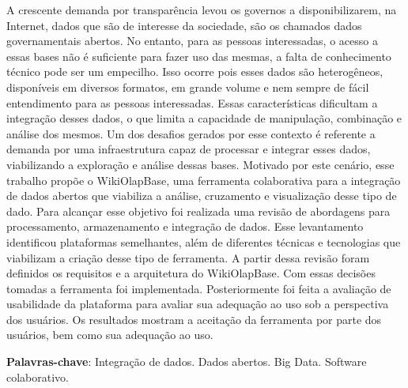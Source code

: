 
\begin{resumo}
   
   A crescente demanda por transparência levou os governos a disponibilizarem, na Internet, 
   dados que são de interesse da sociedade, são os chamados dados governamentais abertos. No 
   entanto, para as pessoas interessadas, o acesso a essas bases não é suficiente para fazer 
   uso das mesmas, a falta de conhecimento técnico pode ser um empecilho. Isso ocorre pois 
   esses dados são heterogêneos, disponíveis em diversos formatos, em grande volume e nem 
   sempre de fácil entendimento para as pessoas interessadas. Essas características dificultam 
   a integração desses dados, o que limita a capacidade de manipulação, combinação e análise 
   dos mesmos. Um dos desafios gerados por esse contexto é referente a demanda por uma 
   infraestrutura capaz de processar e integrar esses dados, viabilizando a exploração e 
   análise dessas bases. Motivado por este cenário, esse trabalho propõe o WikiOlapBase,
   uma ferramenta colaborativa para a integração de dados abertos que viabiliza a análise, 
   cruzamento e visualização desse tipo de dado. Para alcançar esse objetivo foi realizada 
   uma revisão de abordagens para processamento, armazenamento e integração de dados. 
   Esse levantamento identificou plataformas semelhantes, além de diferentes técnicas e 
   tecnologias que viabilizam a criação desse tipo de ferramenta. A partir dessa revisão foram 
   definidos os requisitos e a arquitetura do WikiOlapBase. Com essas decisões tomadas a 
   ferramenta foi implementada. Posteriormente foi feita a avaliação de usabilidade da 
   plataforma para avaliar sua adequação ao uso sob a perspectiva dos usuários. 
   Os resultados mostram a aceitação da ferramenta por parte dos usuários, bem como sua 
   adequação ao uso.

    \textbf{Palavras-chave}: Integração de dados. Dados abertos. Big Data. Software colaborativo.
\end{resumo}

